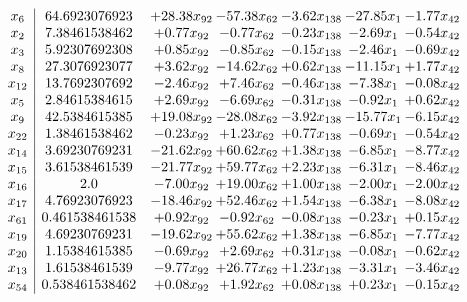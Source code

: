 \documentclass[8pt]{article}
\begin{document}
\[\begin{array}{c| c c@{\hskip 2pt} c@{\hskip 2pt} c@{\hskip 2pt} c@{\hskip 2pt} c@{\hskip 2pt} }
 x_{6}   &  64.6923076923 & + 28.38 x_{92} & -57.38 x_{62} & -3.62 x_{138} & -27.85 x_{1} & -1.77 x_{42}\\
 x_{2}   &  7.38461538462 & +  0.77 x_{92} & -0.77 x_{62} & -0.23 x_{138} & -2.69 x_{1} & -0.54 x_{42}\\
 x_{3}   &  5.92307692308 & +  0.85 x_{92} & -0.85 x_{62} & -0.15 x_{138} & -2.46 x_{1} & -0.69 x_{42}\\
 x_{8}   &  27.3076923077 & +  3.62 x_{92} & -14.62 x_{62} & +  0.62 x_{138} & -11.15 x_{1} & +  1.77 x_{42}\\
 x_{12}   &  13.7692307692 & -2.46 x_{92} & +  7.46 x_{62} & -0.46 x_{138} & -7.38 x_{1} & -0.08 x_{42}\\
 x_{5}   &  2.84615384615 & +  2.69 x_{92} & -6.69 x_{62} & -0.31 x_{138} & -0.92 x_{1} & +  0.62 x_{42}\\
 x_{9}   &  42.5384615385 & + 19.08 x_{92} & -28.08 x_{62} & -3.92 x_{138} & -15.77 x_{1} & -6.15 x_{42}\\
 x_{22}   &  1.38461538462 & -0.23 x_{92} & +  1.23 x_{62} & +  0.77 x_{138} & -0.69 x_{1} & -0.54 x_{42}\\
 x_{14}   &  3.69230769231 & -21.62 x_{92} & + 60.62 x_{62} & +  1.38 x_{138} & -6.85 x_{1} & -8.77 x_{42}\\
 x_{15}   &  3.61538461539 & -21.77 x_{92} & + 59.77 x_{62} & +  2.23 x_{138} & -6.31 x_{1} & -8.46 x_{42}\\
 x_{16}   &  2.0 & -7.00 x_{92} & + 19.00 x_{62} & +  1.00 x_{138} & -2.00 x_{1} & -2.00 x_{42}\\
 x_{17}   &  4.76923076923 & -18.46 x_{92} & + 52.46 x_{62} & +  1.54 x_{138} & -6.38 x_{1} & -8.08 x_{42}\\
 x_{61}   &  0.461538461538 & +  0.92 x_{92} & -0.92 x_{62} & -0.08 x_{138} & -0.23 x_{1} & +  0.15 x_{42}\\
 x_{19}   &  4.69230769231 & -19.62 x_{92} & + 55.62 x_{62} & +  1.38 x_{138} & -6.85 x_{1} & -7.77 x_{42}\\
 x_{20}   &  1.15384615385 & -0.69 x_{92} & +  2.69 x_{62} & +  0.31 x_{138} & -0.08 x_{1} & -0.62 x_{42}\\
 x_{13}   &  1.61538461539 & -9.77 x_{92} & + 26.77 x_{62} & +  1.23 x_{138} & -3.31 x_{1} & -3.46 x_{42}\\
 x_{54}   &  0.538461538462 & +  0.08 x_{92} & +  1.92 x_{62} & +  0.08 x_{138} & +  0.23 x_{1} & -0.15 x_{42}\\

\end{array}\]
\end{document}

